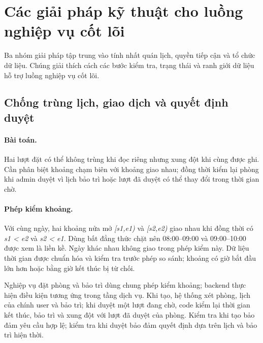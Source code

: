 \FloatBarrier
\section{Các giải pháp kỹ thuật cho luồng nghiệp vụ cốt lõi}
Ba nhóm giải pháp tập trung vào tính nhất quán lịch, quyền tiếp cận và tổ chức dữ liệu. Chúng giải thích cách các bước kiểm tra, trạng thái và ranh giới dữ liệu hỗ trợ luồng nghiệp vụ cốt lõi.

\subsection{Chống trùng lịch, giao dịch và quyết định duyệt}
\label{sec:overlap-solution}
\paragraph{Bài toán.} Hai lượt đặt có thể không trùng khi đọc riêng nhưng xung đột khi cùng được ghi. Cần phân biệt khoảng chạm biên với khoảng giao nhau; đồng thời kiểm lại phòng khi admin duyệt vì lịch bảo trì hoặc lượt đã duyệt có thể thay đổi trong thời gian chờ.

\paragraph{Phép kiểm khoảng.} Với cùng ngày, hai khoảng nửa mở \textit{[s1,e1)} và \textit{[s2,e2)} giao nhau khi đồng thời có \textit{s1 < e2} và \textit{s2 < e1}. Dùng bất đẳng thức chặt nên 08:00--09:00 và 09:00--10:00 được xem là liền kề. Ngày khác nhau không giao trong phép kiểm này. Dữ liệu thời gian được chuẩn hóa và kiểm tra trước phép so sánh; khoảng có giờ bắt đầu lớn hơn hoặc bằng giờ kết thúc bị từ chối.

Nghiệp vụ đặt phòng và bảo trì dùng chung phép kiểm khoảng; backend thực hiện điều kiện tương ứng trong tầng dịch vụ. Khi tạo, hệ thống xét phòng, lịch của chính user và bảo trì; khi duyệt một lượt đang chờ, code kiểm lại thời gian kết thúc, bảo trì và xung đột với lượt đã duyệt của phòng. Kiểm tra khi tạo bảo đảm yêu cầu hợp lệ; kiểm tra khi duyệt bảo đảm quyết định dựa trên lịch và bảo trì hiện thời.

